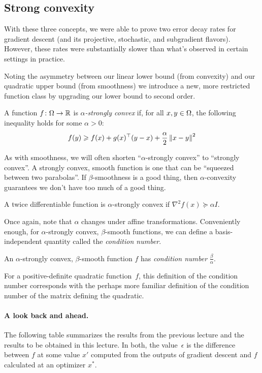 \subsection{Strong convexity}

With these three concepts, we were able to prove two error decay rates for
gradient descent (and its projective, stochastic, and subgradient flavors).
However, these rates were substantially slower than what's observed in certain
settings in practice.

Noting the asymmetry between our linear lower bound (from convexity) and our
quadratic upper bound (from smoothness) we introduce a new, more restricted
function class by upgrading our lower bound to second order.

\begin{definition}
A function $f\colon\Omega\to\mathbb{R}$
is \emph{$\alpha$-strongly convex}
if, for all $x,y\in\Omega$,
the following inequality holds
for some $\alpha>0$:
\[
f(y) \geqslant f(x) + g(x)^\top(y-x) + \frac{\alpha}{2}\left\lVert x-y\right\rVert^2
\]
\end{definition}

As with smoothness, we will often shorten ``$\alpha$-strongly convex'' to
``strongly convex''.  A strongly convex, smooth function is one that can be
``squeezed between two parabolas''.  If $\beta$-smoothness is a good thing, then
$\alpha$-convexity guarantees we don't have too much of a good thing.

A twice differentiable function
is $\alpha$-strongly convex if $\nabla^2f(x) \succeq \alpha I$.

Once again, note that $\alpha$ changes under affine transformations.
Conveniently enough, for $\alpha$-strongly convex, $\beta$-smooth functions, we
can define a basis-independent quantity called the \emph{condition number}.

\begin{definition}
An $\alpha$-strongly convex, $\beta$-smooth function $f$
has \emph{condition number} $\frac{\beta}{\alpha}$.
\end{definition}

For a positive-definite quadratic function~$f$, this definition of the condition
number corresponds with the perhaps more familiar definition of the condition
number of the matrix defining the quadratic.

\paragraph{A look back and ahead.}
%
The following table summarizes the results from the previous lecture and the
results to be obtained in this lecture.  In both, the value~$\epsilon$ is the
difference between $f$ at some value $x'$ computed from the outputs of gradient
descent and $f$ calculated at an optimizer $x^*$.

